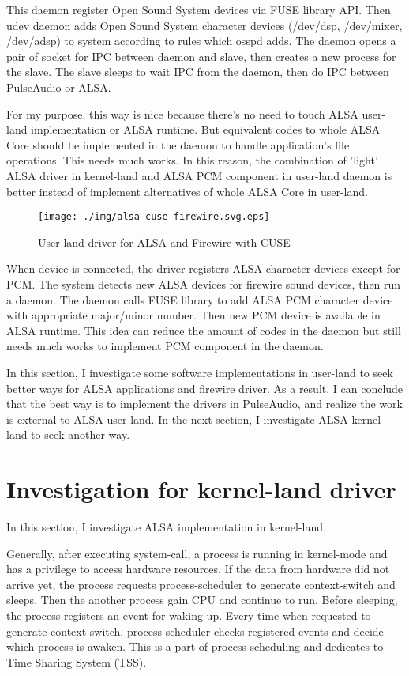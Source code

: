\documentclass[onecolumn]{article}
\begin{document}
This daemon register Open Sound System devices via FUSE library API. Then udev daemon adds Open Sound System character devices (/dev/dsp, /dev/mixer, /dev/adsp) to system according to rules which osspd adds. The daemon opens a pair of socket for IPC between daemon and slave, then creates a new process for the slave. The slave sleeps to wait IPC from the daemon, then do IPC between PulseAudio or ALSA.

For my purpose, this way is nice because there's no need to touch ALSA user-land implementation or ALSA runtime. But equivalent codes to whole ALSA Core should be implemented in the daemon to handle application's file operations. This needs much works. In this reason, the combination of 'light' ALSA driver in kernel-land and ALSA PCM component in user-land daemon is better instead of implement alternatives of whole ALSA Core in user-land.

\begin{figure}[H]
	\centering
	\texttt{[image: ./img/alsa-cuse-firewire.svg.eps]}
	\caption{{User-land driver for ALSA and Firewire with CUSE}}
	\label{alsa_cuse_firewire}
\end{figure}

When device is connected, the driver registers ALSA character devices except for PCM. The system detects new ALSA devices for firewire sound devices, then run a daemon. The daemon calls FUSE library to add ALSA PCM character device with appropriate major/minor number. Then new PCM device is available in ALSA runtime. This idea can reduce the amount of codes in the daemon but still needs much works to implement PCM component in the daemon.

In this section, I investigate some software implementations in user-land to seek better ways for ALSA applications and firewire driver. As a result, I can conclude that the best way is to implement the drivers in PulseAudio, and realize the work is external to ALSA user-land. In the next section, I investigate ALSA kernel-land to seek another way.


\section{Investigation for kernel-land driver}

In this section, I investigate ALSA implementation in kernel-land.

Generally, after executing system-call, a process is running in kernel-mode and has a privilege to access hardware resources. If the data from hardware did not arrive yet, the process requests process-scheduler to generate context-switch and sleeps. Then the another process gain CPU and continue to run. Before sleeping, the process registers an event for waking-up. Every time when requested to generate context-switch, process-scheduler checks registered events and decide which process is awaken. This is a part of process-scheduling and dedicates to Time Sharing System (TSS).
\end{document}
